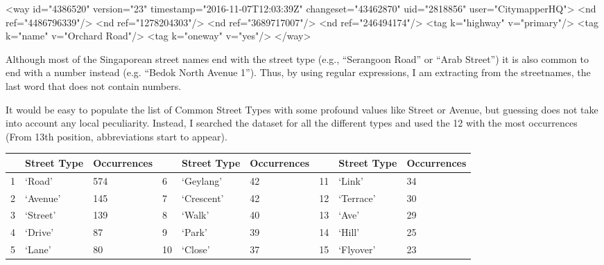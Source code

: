 \documentclass[11pt]{article}
\newenvironment{Shaded}{}{}
\newcommand{\StringTok}[1]{\textcolor[rgb]{0.25,0.44,0.63}{{#1}}}
\newcommand{\NormalTok}[1]{{#1}}
\newcommand{\OperatorTok}[1]{\textcolor[rgb]{0.40,0.40,0.40}{{#1}}}
\newcommand{\BuiltInTok}[1]{{#1}}
\begin{document}
    \begin{Shaded}
\begin{Highlighting}[]
\OperatorTok{<}\NormalTok{way }\BuiltInTok{id}\OperatorTok{=}\StringTok{"4386520"} \NormalTok{version}\OperatorTok{=}\StringTok{"23"} \NormalTok{timestamp}\OperatorTok{=}\StringTok{"2016-11-07T12:03:39Z"}
\NormalTok{changeset}\OperatorTok{=}\StringTok{"43462870"} \NormalTok{uid}\OperatorTok{=}\StringTok{"2818856"} \NormalTok{user}\OperatorTok{=}\StringTok{"CitymapperHQ"}\OperatorTok{>}
    \OperatorTok{<}\NormalTok{nd ref}\OperatorTok{=}\StringTok{"4486796339"}\OperatorTok{/>}
    \OperatorTok{<}\NormalTok{nd ref}\OperatorTok{=}\StringTok{"1278204303"}\OperatorTok{/>}
    \OperatorTok{<}\NormalTok{nd ref}\OperatorTok{=}\StringTok{"3689717007"}\OperatorTok{/>}
    \OperatorTok{<}\NormalTok{nd ref}\OperatorTok{=}\StringTok{"246494174"}\OperatorTok{/>}
    \OperatorTok{<}\NormalTok{tag k}\OperatorTok{=}\StringTok{"highway"} \NormalTok{v}\OperatorTok{=}\StringTok{"primary"}\OperatorTok{/>}
    \OperatorTok{<}\NormalTok{tag k}\OperatorTok{=}\StringTok{"name"} \NormalTok{v}\OperatorTok{=}\StringTok{"Orchard Road"}\OperatorTok{/>}
    \OperatorTok{<}\NormalTok{tag k}\OperatorTok{=}\StringTok{"oneway"} \NormalTok{v}\OperatorTok{=}\StringTok{"yes"}\OperatorTok{/>}
  \OperatorTok{</}\NormalTok{way}\OperatorTok{>}
\end{Highlighting}
\end{Shaded}

    Although most of the Singaporean street names end with the street type
(e.g., ``Serangoon Road'' or ``Arab Street'') it is also common to end
with a number instead (e.g. ``Bedok North Avenue 1''). Thus, by using
regular expressions, I am extracting from the streetnames, the last word that does not contain
numbers.

    It would be easy to populate the list of Common Street Types with some
profound values like Street or Avenue, but guessing does not take into
account any local peculiarity. Instead, I searched the dataset for all
the different types and used the 12 with the most occurrences (From 13th
position, abbreviations start to appear).



    \begin{longtable}[c]{@{}lllllllll@{}}
\toprule
& Street Type & Occurrences & & Street Type & Occurrences & & Street
Type & Occurrences\tabularnewline
\midrule
\endhead
1 & `Road' & 574 & 6 & `Geylang' & 42 & 11 & `Link' & 34\tabularnewline
2 & `Avenue' & 145 & 7 & `Crescent' & 42 & 12 & `Terrace' &
30\tabularnewline
3 & `Street' & 139 & 8 & `Walk' & 40 & 13 & `Ave' & 29\tabularnewline
4 & `Drive' & 87 & 9 & `Park' & 39 & 14 & `Hill' & 25\tabularnewline
5 & `Lane' & 80 & 10 & `Close' & 37 & 15 & `Flyover' & 23\tabularnewline
\bottomrule
\end{longtable}
\end{document}
